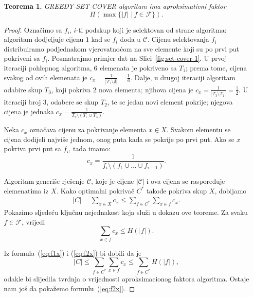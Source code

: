 \documentclass[a4paper, utf8, 11pt, colorlinks]{book}
\newtheorem{thm}{Teorema}[chapter]
\theoremstyle{definition}
\begin{document}
\begin{thm}
	  \mbox{GREEDY-SET-COVER} algoritam ima aproksimativni faktor 
	$$ H(\max\{|f| \mid f \in \mathcal{F}\}).$$
	
\end{thm}
\begin{proof}
	  Označimo sa $f_i$, $i$-ti podskup koji je selektovan od strane algoritma: algoritam dodjeljuje cijenu $1$ kad se $f_i$ doda u $\mathcal{C}$. 
	  Cijenu selektovanja $f_i$ distribuiramo podjednakom vjerovatnoćom na sve elemente koji su po prvi put pokriveni sa $f_i$. Posmatrajmo primjer dat na Slici~\ref{fig:set-cover-1}. U prvoj iteraciji pohlepnog algoritma,  
	  6 elemenata je pokriveno sa $T_1$; prema tome, cijena svakog od ovih elemenata je $c_x = \frac{1}{|T_1\setminus \emptyset|}= \frac{1}{6}$. Dalje, u drugoj iteraciji algoritam odabire skup $T_3$, koji pokriva 2 nova elementa; njihova cijena je $c_x=\frac{1}{|T_3 \setminus T_1|} = \frac{1}{2}$. U iteraciji broj 3, odabere se skup $T_2$, te se jedan novi element pokrije; njegova cijena je jednaka $c_x = \frac{1}{T_2 \setminus ( T_1 \cup T_3)}$. 
	 
	 Neka $ c_x$ označava cijenu za pokrivanje elementa $x\in X$.  Svakom elementu se cijena dodijeli najviše jednom, onog puta kada se pokrije po prvi put. Ako se $x$ pokriva prvi put sa $f_i$, tada imamo:
	 $$c_x = \frac{1}{f_i \setminus (f_1 \cup ...\cup f_{i-1})}.$$
	 
	 Algoritam generiše rješenje $\mathcal{C}$, koje je cijene $|\mathcal{C}|$ i ova cijena se raspoređuje elemenatima iz $X$. Kako optimalni pokrivač $C^*$ takođe pokriva skup $X$, dobijamo
	 \begin{align}\label{eq:f1x}
	 	|C| = \sum_{x \in X} c_x \leq \sum_{f \in C^*}\sum_{x \in f} c_x.
	 \end{align}
	  Pokazimo sljedeću ključnu nejednakost koja služi u dokazu ove teoreme. Za svaku $f \in \mathcal{F}$, vrijedi  
	 \begin{equation}\label{eq:f2x}
	 	\sum_{x \in f} c_x \leq H(|f|).
	 \end{equation}
	 
	 Iz formula~(\ref{eq:f1x}) i (\ref{eq:f2x}) bi dobili da je 
	 \begin{equation}
	 	|C| \leq \sum_{f \in C^*}\sum_{x \in f} c_x \leq \sum_{f \in C^*} H(|f|),
	 \end{equation}
	 odakle bi slijedila tvrdnja o vrijednosti aproksimacionog faktora algoritma.
	 Ostaje nam još da pokažemo formulu~(\ref{eq:f2x}). 
	 

\end{proof}
\end{document}
